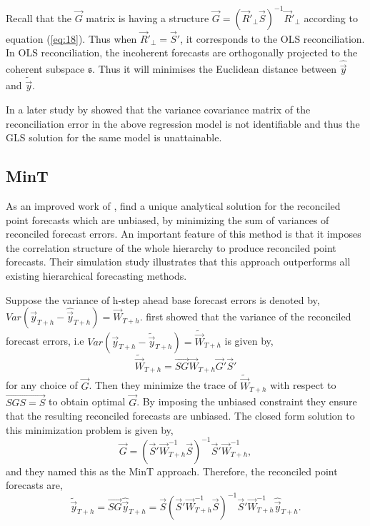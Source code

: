 \documentclass[graybox]{svmult}
\begin{document}
Recall that the $\vec{G}$ matrix is having a structure $\vec{G}=(\vec{R}'_\bot \vec{S})^{-1}\vec{R}'_\bot$ according to equation (\ref{eq:18}). Thus when $\vec{R}'_\bot = \vec{S}'$, it corresponds to the OLS reconciliation. In OLS reconciliation, the incoherent forecasts are orthogonally projected to the coherent subspace $\mathfrak{s}$. Thus it will minimises the Euclidean distance between $\hat{\vec{y}}$ and $\tilde{\vec{y}}$. 

In a later study by \cite{Wickramasuriya2018} showed that the variance covariance matrix of the reconciliation error in the above regression model is not identifiable and thus the GLS solution for the same model is unattainable. 


\subsection{MinT}

As an improved work of \cite{hyndman2011}, \cite{Wickramasuriya2018} find a unique analytical solution for the reconciled point forecasts which are unbiased, by minimizing the sum of variances of reconciled forecast errors. An important feature of this method is that it imposes the correlation structure of the whole hierarchy to produce reconciled point forecasts. Their simulation study illustrates that this approach outperforms all existing hierarchical forecasting methods. 

Suppose the variance of  h-step ahead base forecast errors is denoted by, $Var(\vec{y}_{T+h} - \hat{\vec{y}}_{T+h}) = \vec{W}_{T+h}$. \cite{Wickramasuriya2018} first showed that the variance of the reconciled forecast errors, i.e $Var(\vec{y}_{T+h} - \tilde{\vec{y}}_{T+h}) = \tilde{\vec{W}}_{T+h}$ is given by,
\begin{equation} \label{eq:23}
\tilde{\vec{W}}_{T+h} = \vec{SG}\vec{W}_{T+h} \vec{G}'\vec{S}'
\end{equation}
for any choice of $\vec{G}$. Then they minimize the trace of $\tilde{\vec{W}}_{T+h}$ with respect to $\vec{SGS=S}$ to obtain optimal $\vec{G}$. By imposing the unbiased constraint they ensure that the resulting reconciled forecasts are unbiased. The closed form solution to this minimization problem is given by,
\begin{equation} \label{eq:24}
\vec{G} = (\vec{S}'{\vec{W}}_{T+h}^{-1}\vec{S})^{-1}\vec{S}'{\vec{W}}_{T+h}^{-1},
\end{equation}
and they named this as the MinT approach. Therefore, the reconciled point forecasts are,
\begin{equation} \label{eq:25}
\tilde{\vec{y}}_{T+h} = \vec{SG}\hat{\vec{y}}_{T+h} = \vec{S}(\vec{S}'{\vec{W}}_{T+h}^{-1}\vec{S})^{-1}\vec{S}'{\vec{W}}_{T+h}^{-1}\hat{\vec{y}}_{T+h}.
\end{equation}\\
\end{document}
